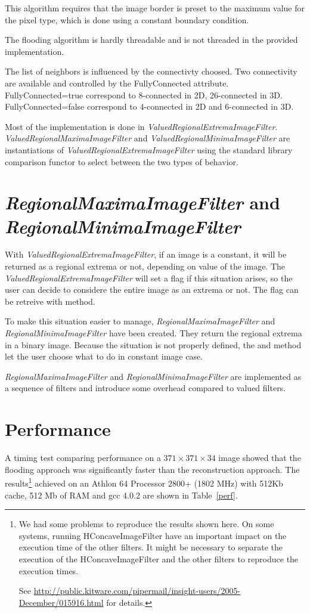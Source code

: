 \documentclass{InsightArticle}
\begin{document}
This algorithm requires that the image border is preset to the maximum
value for the pixel type, which is done using a constant boundary
condition.

The flooding algorithm is hardly threadable and is not threaded in the provided
implementation.

The list of neighbors is influenced by the connectivty choosed. Two connectivity
are available and controlled by the FullyConnected attribute. FullyConnected=true
correspond to 8-connected in 2D, 26-connected in 3D. FullyConnected=false correspond
to 4-connected in 2D and 6-connected in 3D.

Most of the implementation is done in {\em ValuedRegionalExtremaImageFilter}.
{\em ValuedRegionalMaximaImageFilter} and {\em
ValuedRegionalMinimaImageFilter} are instantiations of {\em
ValuedRegionalExtremaImageFilter} using the standard library
comparison functor to select between the two types of behavior.

\section{{\em RegionalMaximaImageFilter} and {\em RegionalMinimaImageFilter}}
With {\em ValuedRegionalExtremaImageFilter}, if an image is a constant, it will
be returned as a regional extrema or not,
depending on value of the image. The {\em ValuedRegionalExtremaImageFilter} will set a flag if
this situation arises, so the user can decide to considere the entire image as an
extrema or not. The flag can be retreive with  method.

To make this situation easier to manage, {\em RegionalMaximaImageFilter} and
{\em RegionalMinimaImageFilter} have been created. They return the regional
extrema in a binary image. Because the situation is not properly defined, the 
 and  method let the user choose what to do
in constant image case.

{\em RegionalMaximaImageFilter} and {\em RegionalMinimaImageFilter} are implemented as a sequence
of filters and introduce some overhead compared to valued filters.

\section{Performance}
A timing test comparing performance on a $371 \times 371 \times 34$
image showed that the flooding approach was significantly faster than
the reconstruction approach. The results\footnote{We had some problems
to reproduce the results shown here. On some systems, running
HConcaveImageFilter have an important impact on the execution time of the other
filters. It might be necessary to separate the execution of the 
HConcaveImageFilter and the other filters to reproduce the execution
times.

See \url{http://public.kitware.com/pipermail/insight-users/2005-December/015916.html}
for details.} achieved on an Athlon 64 
Processor 2800+ (1802 MHz) with 512Kb cache, 512 Mb of RAM and gcc
4.0.2 are shown in Table~\ref{perf}.
\end{document}
